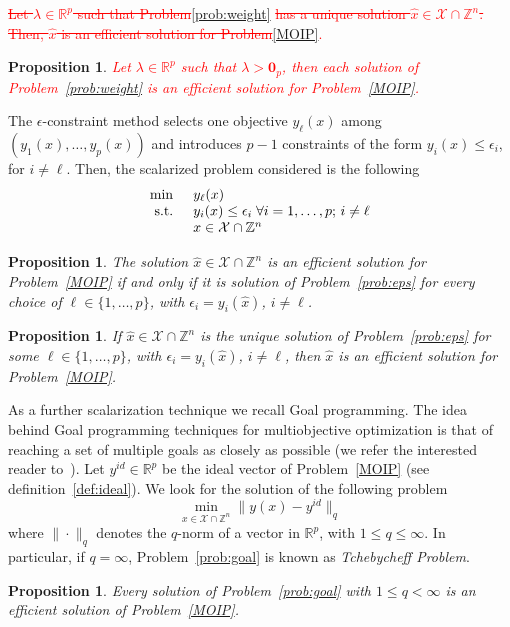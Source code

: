 \documentclass[preprint,12pt]{elsarticle}
\newcommand{\red}[1]{\textcolor{red}{#1}}
\newtheorem{proposition}[theorem]{Proposition}
\def\R{\mathbb{R}}
\def\Z{\mathbb{Z}}
\begin{document}
 
\red{ \st{Let $\lambda \in \R^p$ such that Problem}\eqref{prob:weight} \st{has a unique solution $\hat x \in \mathcal{X}\cap \Z^n$. Then, $\hat x$ is an efficient solution
 for Problem}\eqref{MOIP}.}
\begin{proposition}\label{prop:weight}
\red{ Let $\lambda \in \R^p$ such that $\lambda > \textbf{0}_p$, then each solution of Problem~\eqref{prob:weight} is an efficient solution
 for Problem~\eqref{MOIP}.}
\end{proposition}
The $\epsilon$-constraint method selects one objective $y_{\ell}(x)$ among $(y_1(x),\ldots,y_p(x))$ and introduces $p-1$ constraints of the form $y_i(x)\leq \epsilon_i$, for $i\neq \ell$.
Then, the scalarized problem considered is the following
\begin{equation}\label{prob:eps}
\begin{array}{l l}
    \min & y_{\ell}(x)\\
    \textnormal{ s.t. }& y_i(x)\leq \epsilon_i \; \forall i=1,\ldots,p;\, i\neq \ell\\
    & x\in \mathcal{X}\cap \Z^n
  \end{array}
 \end{equation}
\begin{proposition}\label{prop:eps}
 The solution $\hat x\in \mathcal{X}\cap \Z^n$ is an efficient solution for Problem~\eqref{MOIP} if and only if
 it is solution of Problem~\eqref{prob:eps} for every choice of $\ell\in \{1,\ldots,p\}$, with $\epsilon_i = y_i(\hat x)$, $i\neq \ell$.
\end{proposition}

\begin{proposition}\label{prop:eps2}
 If $\hat x\in \mathcal{X}\cap \Z^n$ is the unique solution of Problem~\eqref{prob:eps} for some $\ell\in \{1,\ldots,p\}$, with $\epsilon_i = y_i(\hat x)$, $i\neq \ell$,
 then $\hat x$ is an efficient solution for Problem~\eqref{MOIP}.
\end{proposition}

As a further scalarization technique we recall Goal programming.
The idea behind Goal programming techniques for multiobjective optimization is that of reaching a set of multiple goals as closely as possible
(we refer the interested reader to~\cite{jones2010practical, miettinen1999nonlinear}).
Let $y^{id}\in \R^p$ be the ideal vector of Problem~\eqref{MOIP} (see definition~\ref{def:ideal}). We look for the solution of the following
problem
\begin{equation}\label{prob:goal}
\min_{x\in \mathcal{X}\cap \Z^n} \|y(x) - y^{id}\|_q
\end{equation}
where $\|\cdot\|_q$ denotes the $q$-norm of a vector in $\R^p$, with $1\leq q\leq \infty$.
In particular, if $q=\infty$, Problem~\eqref{prob:goal} is known as \emph{Tchebycheff Problem}.
\begin{proposition}\label{prop:goal}
Every solution of Problem~\eqref{prob:goal} with $1\leq q< \infty$ is an efficient solution of Problem~\eqref{MOIP}.
\end{proposition}
\end{document}
